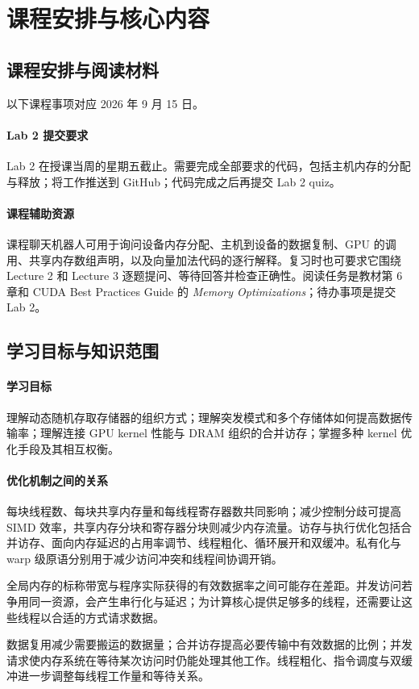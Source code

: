 \section{课程安排与核心内容}
\subsection{课程安排与阅读材料}
以下课程事项对应 2026 年 9 月 15 日。

\paragraph{Lab 2 提交要求}
Lab 2 在授课当周的星期五截止。需要完成全部要求的代码，包括主机内存的分配与释放；将工作推送到 GitHub；代码完成之后再提交 Lab 2 quiz。

\paragraph{课程辅助资源}
课程聊天机器人可用于询问设备内存分配、主机到设备的数据复制、GPU 的调用、共享内存数组声明，以及向量加法代码的逐行解释。复习时也可要求它围绕 Lecture 2 和 Lecture 3 逐题提问、等待回答并检查正确性。阅读任务是教材第 6 章和 CUDA Best Practices Guide 的 \textit{Memory Optimizations}；待办事项是提交 Lab 2。

\subsection{学习目标与知识范围}
\paragraph{学习目标}
理解动态随机存取存储器的组织方式；理解突发模式和多个存储体如何提高数据传输率；理解连接 GPU kernel 性能与 DRAM 组织的合并访存；掌握多种 kernel 优化手段及其相互权衡。

\paragraph{优化机制之间的关系}
每块线程数、每块共享内存量和每线程寄存器数共同影响；减少控制分歧可提高 SIMD 效率，共享内存分块和寄存器分块则减少内存流量。访存与执行优化包括合并访存、面向内存延迟的占用率调节、线程粗化、循环展开和双缓冲。私有化与 warp 级原语分别用于减少访问冲突和线程间协调开销。

全局内存的标称带宽与程序实际获得的有效数据率之间可能存在差距。并发访问若争用同一资源，会产生串行化与延迟；为计算核心提供足够多的线程，还需要让这些线程以合适的方式请求数据。

\begin{keybox}[title={三种互补的改进方向}]
数据复用减少需要搬运的数据量；合并访存提高必要传输中有效数据的比例；并发请求使内存系统在等待某次访问时仍能处理其他工作。线程粗化、指令调度与双缓冲进一步调整每线程工作量和等待关系。
\end{keybox}
